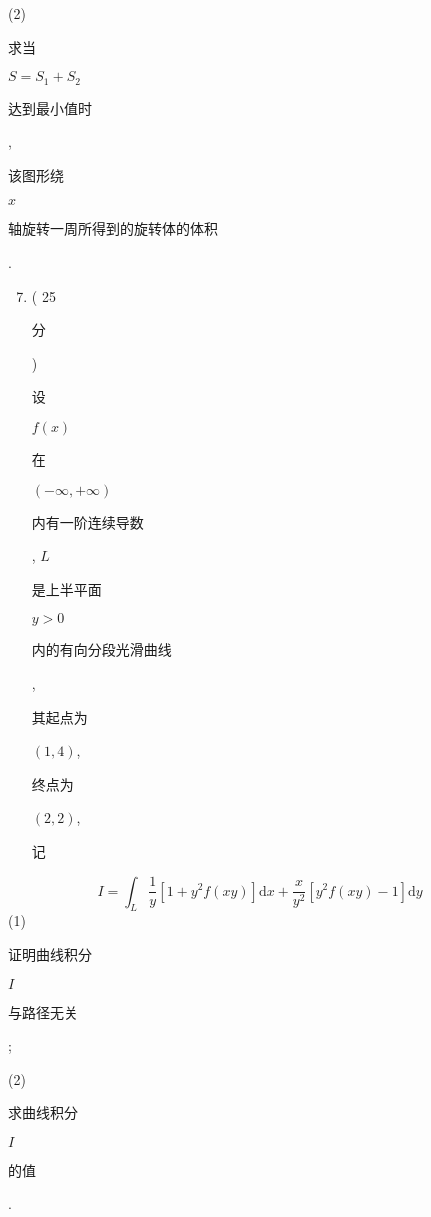 \documentclass[10pt]{article}
\begin{document}
(2) \begin{CJK}{UTF8}{mj}求当\end{CJK} $S=S_{1}+S_{2}$ \begin{CJK}{UTF8}{mj}达到最小值时\end{CJK}, \begin{CJK}{UTF8}{mj}该图形绕\end{CJK} $x$ \begin{CJK}{UTF8}{mj}轴旋转一周所得到的旋转体的体积\end{CJK}.

\begin{enumerate}
  \setcounter{enumi}{6}
  \item ( 25 \begin{CJK}{UTF8}{mj}分\end{CJK}) \begin{CJK}{UTF8}{mj}设\end{CJK} $f(x)$ \begin{CJK}{UTF8}{mj}在\end{CJK} $(-\infty,+\infty)$ \begin{CJK}{UTF8}{mj}内有一阶连续导数\end{CJK}, $L$ \begin{CJK}{UTF8}{mj}是上半平面\end{CJK} $y>0$ \begin{CJK}{UTF8}{mj}内的有向分段光滑曲线\end{CJK}, \begin{CJK}{UTF8}{mj}其起点为\end{CJK} $(1,4)$, \begin{CJK}{UTF8}{mj}终点为\end{CJK} $(2,2)$, \begin{CJK}{UTF8}{mj}记\end{CJK}
\end{enumerate}
$$
I=\int_{L} \frac{1}{y}\left[1+y^{2} f(x y)\right] \mathrm{d} x+\frac{x}{y^{2}}\left[y^{2} f(x y)-1\right] \mathrm{d} y
$$
(1) \begin{CJK}{UTF8}{mj}证明曲线积分\end{CJK} $I$ \begin{CJK}{UTF8}{mj}与路径无关\end{CJK};

(2) \begin{CJK}{UTF8}{mj}求曲线积分\end{CJK} $I$ \begin{CJK}{UTF8}{mj}的值\end{CJK}.
\end{document}
